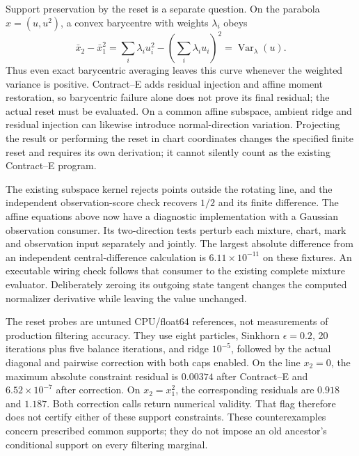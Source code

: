 \documentclass[11pt]{article}
\begin{document}
Support preservation by the reset is a separate question.  On the parabola
$x=(u,u^2)$, a convex barycentre with weights $\lambda_i$ obeys
\begin{equation}
 \bar x_2-\bar x_1^2
   =\sum_i\lambda_i u_i^2-\left(\sum_i\lambda_i u_i\right)^2
   =\operatorname{Var}_\lambda(u).
 \label{eq:curved-support-barycentre}
\end{equation}
Thus even exact barycentric averaging leaves this curve whenever the weighted
variance is positive.  Contract--E adds residual injection and affine moment
restoration, so barycentric failure alone does not prove its final residual;
the actual reset must be evaluated.  On a common affine subspace, ambient
ridge and residual injection can likewise introduce normal-direction
variation.  Projecting the result or performing the reset in chart
coordinates changes the specified finite reset and requires its own
derivation; it cannot silently count as the existing Contract--E program.

The existing subspace kernel rejects points outside the rotating line,
and the independent observation-score check
recovers $1/2$ and its finite difference.  The affine equations above now have
a diagnostic implementation with a Gaussian observation consumer.  Its
two-direction tests perturb each mixture, chart, mark and observation input
separately and jointly.  The largest absolute difference from an independent
central-difference calculation is $6.11\times10^{-11}$ on these fixtures.
An executable wiring check follows that consumer to the existing complete
mixture evaluator.  Deliberately zeroing its outgoing state tangent changes
the computed normalizer derivative while leaving the value unchanged.

The reset probes are untuned CPU/float64 references, not measurements of
production filtering accuracy.  They use eight particles, Sinkhorn
$\epsilon=0.2$, 20 iterations plus five balance iterations, and ridge
$10^{-5}$, followed by the actual diagonal and pairwise correction with both
caps enabled.  On the line $x_2=0$, the maximum absolute constraint residual
is $0.00374$ after Contract--E and $6.52\times10^{-7}$ after correction.  On
$x_2=x_1^2$, the corresponding residuals are $0.918$ and $1.187$.  Both
correction calls return numerical validity.  That flag therefore does not
certify either of these support constraints.  These counterexamples concern
prescribed common supports; they do not impose an old ancestor's conditional
support on every filtering marginal.
\end{document}

